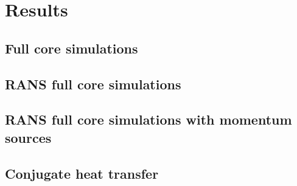 \section{Results}
\label{sec:results}

\subsection{Full core simulations}
\label{sec:results1}

\subsection{RANS full core simulations}
\label{sec:results2}

\subsection{RANS full core simulations with momentum sources}
\label{sec:results3}

\subsection{Conjugate heat transfer}
\label{sec:results4}
